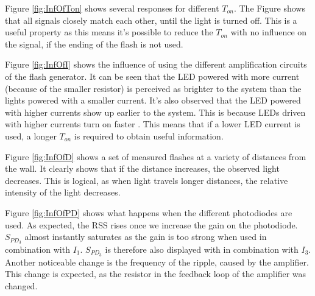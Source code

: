 Figure \ref{fig:InfOfTon} shows several responses for different $T_{on}$. The Figure shows that all signals closely match each other, until the light is turned off. This is a useful property as this means it's possible to reduce the $T_{on}$ with no influence on the signal, if the ending of the flash is not used.

Figure \ref{fig:InfOfI} shows the influence of using the different amplification circuits of the flash generator. It can be seen that the LED powered with more current (because of the smaller resistor) is perceived as brighter to the system than the lights powered with a smaller current. It's also observed that the LED powered with higher currents show up earlier to the system. This is because LEDs driven with higher currents turn on faster \cite{LED_on}. This means that if a lower LED current is used, a longer $T_{on}$ is required to obtain useful information.

Figure \ref{fig:InfOfD} shows a set of measured flashes at a variety of distances from the wall. It clearly shows that if the distance increases, the observed light decreases. This is logical, as when light travels longer distances, the relative intensity of the light decreases. 

Figure \ref{fig:InfOfPD} shows what happens when the different photodiodes are used. As expected, the RSS rises once we increase the gain on the photodiode. $S_{PD_3}$ almost instantly saturates as the gain is too strong when used in combination with $I_1$. $S_{PD_3}$ is therefore also displayed with in combination with $I_3$. Another noticeable change is the frequency of the ripple, caused by the amplifier. This change is expected, as the resistor in the feedback loop of the amplifier was changed.

